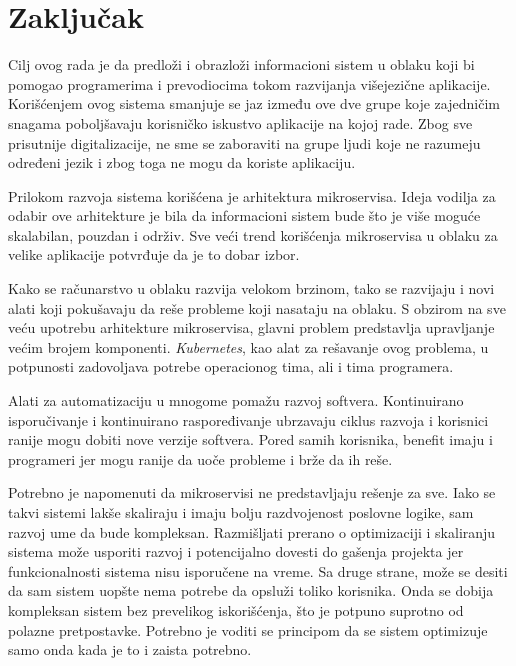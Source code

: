 \chapter{Zaključak}\label{ch:zakljucak}

Cilj ovog rada je da predloži i obrazloži informacioni sistem u oblaku koji bi pomogao 
programerima i prevodiocima tokom razvijanja višejezične aplikacije. Korišćenjem ovog 
sistema smanjuje se jaz između ove dve grupe koje zajedničim snagama poboljšavaju 
korisničko iskustvo aplikacije na kojoj rade. Zbog sve prisutnije digitalizacije, 
ne sme se zaboraviti na grupe ljudi koje ne razumeju određeni jezik i zbog toga 
ne mogu da koriste aplikaciju.

Prilokom razvoja sistema korišćena je arhitektura mikroservisa. Ideja vodilja za odabir 
ove arhitekture je bila da informacioni sistem bude što je više moguće skalabilan, 
pouzdan i održiv. Sve veći trend korišćenja mikroservisa u oblaku za velike aplikacije 
potvrđuje da je to dobar izbor. 

Kako se računarstvo u oblaku razvija velokom brzinom, tako se razvijaju i novi alati 
koji pokušavaju da reše probleme koji nasataju na oblaku. S obzirom na sve veću upotrebu 
arhitekture mikroservisa, glavni problem predstavlja upravljanje većim brojem komponenti.
\textit{Kubernetes}, kao alat za rešavanje ovog problema, u potpunosti zadovoljava 
potrebe operacionog tima, ali i tima programera.

Alati za automatizaciju u mnogome pomažu razvoj softvera. Kontinuirano isporučivanje 
i kontinuirano raspoređivanje ubrzavaju ciklus razvoja i korisnici ranije mogu dobiti 
nove verzije softvera. Pored samih korisnika, benefit imaju i programeri jer mogu 
ranije da uoče probleme i brže da ih reše.

Potrebno je napomenuti da mikroservisi ne predstavljaju rešenje za sve. Iako se takvi 
sistemi lakše skaliraju i imaju bolju razdvojenost poslovne logike, sam razvoj ume da 
bude kompleksan. Razmišljati prerano o optimizaciji i skaliranju sistema može usporiti 
razvoj i potencijalno dovesti do gašenja projekta jer funkcionalnosti sistema nisu 
isporučene na vreme. Sa druge strane, može se desiti da sam sistem uopšte nema potrebe 
da opsluži toliko korisnika. Onda se dobija kompleksan sistem bez prevelikog iskorišćenja,
što je potpuno suprotno od polazne pretpostavke. Potrebno je voditi se principom da se 
sistem optimizuje samo onda kada je to i zaista potrebno.
